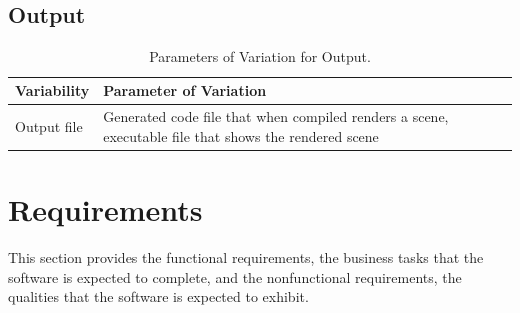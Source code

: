 \documentclass[12pt]{article}
\begin{document}
~\newline

\subsection{Output} \label{sec_Output}    
\begin{table}[H]
	\centering
	\begin{tabular}{|p{5cm}|p{10cm}|}
		\hline
		\textbf{Variability} & \textbf{Parameter of Variation} \\
		\hline
		Output file & Generated code file that when compiled renders a scene, 
		executable file that shows the rendered scene\\
		\hline
	\end{tabular}
	\caption{Parameters of Variation for Output.}
	\label{tbl:Output_Variations}
\end{table}

\section{Requirements}
This section provides the functional requirements, the business tasks that the
software is expected to complete, and the nonfunctional requirements, the
qualities that the software is expected to exhibit.
\end{document}
